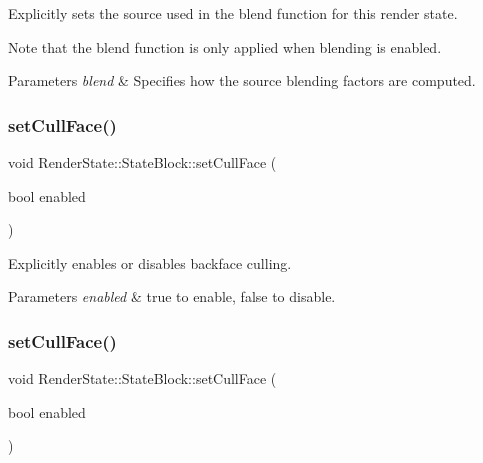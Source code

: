 Explicitly sets the source used in the blend function for this render state.

Note that the blend function is only applied when blending is enabled.


\begin{DoxyParams}{Parameters}
{\em blend} & Specifies how the source blending factors are computed. \\
\hline
\end{DoxyParams}
\mbox{\label{classRenderState_1_1StateBlock_aee954a3ca23df9c4fbe91aed0d62c216}} 
\subsubsection{\texorpdfstring{set\+Cull\+Face()}{setCullFace()}\hspace{0.1cm}{\footnotesize\ttfamily [1/2]}}
{\footnotesize\ttfamily void Render\+State\+::\+State\+Block\+::set\+Cull\+Face (\begin{DoxyParamCaption}\item[{bool}]{enabled }\end{DoxyParamCaption})}

Explicitly enables or disables backface culling.


\begin{DoxyParams}{Parameters}
{\em enabled} & true to enable, false to disable. \\
\hline
\end{DoxyParams}
\mbox{\label{classRenderState_1_1StateBlock_aee954a3ca23df9c4fbe91aed0d62c216}} 
\subsubsection{\texorpdfstring{set\+Cull\+Face()}{setCullFace()}\hspace{0.1cm}{\footnotesize\ttfamily [2/2]}}
{\footnotesize\ttfamily void Render\+State\+::\+State\+Block\+::set\+Cull\+Face (\begin{DoxyParamCaption}\item[{bool}]{enabled }\end{DoxyParamCaption})}

